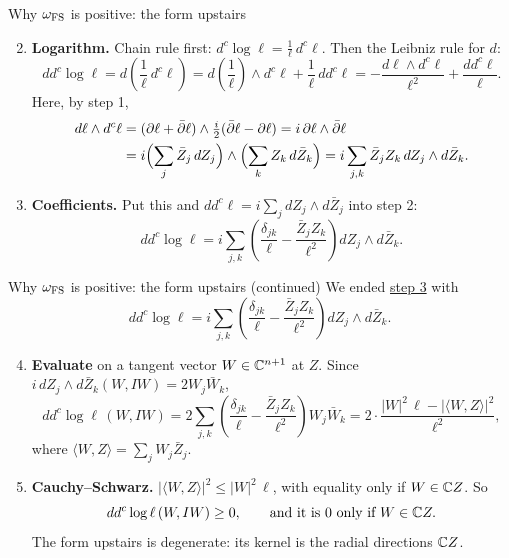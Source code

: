 \begin{frame}{Why \(\omega_{\rm FS}\) is positive: the form upstairs}
\label{fr:fs-upstairs}
\begin{enumerate}
\setcounter{enumi}{1}
\item \textbf{Logarithm.} Chain rule first: \(d^c\log\ell=\frac{1}{\ell}\,d^c\ell\). Then the Leibniz rule for \(d\):
\[
dd^c\log\ell
=d\left(\frac{1}{\ell}\,d^c\ell\right)
=d\left(\frac{1}{\ell}\right)\wedge d^c\ell+\frac{1}{\ell}\,dd^c\ell
=-\frac{d\ell\wedge d^c\ell}{\ell^2}+\frac{dd^c\ell}{\ell}.
\]
Here, by step 1,
\[
\begin{aligned}
d\ell\wedge d^c\ell&=(\partial\ell+\bar\partial\ell)\wedge\tfrac{i}{2}(\bar\partial\ell-\partial\ell)=i\,\partial\ell\wedge\bar\partial\ell\\
&=i\Bigl(\sum_j\bar Z_j\,dZ_j\Bigr)\wedge\Bigl(\sum_k Z_k\,d\bar Z_k\Bigr)
=i\sum_{j,k}\bar Z_jZ_k\,dZ_j\wedge d\bar Z_k.
\end{aligned}
\]
\item \textbf{Coefficients.} Put this and \(dd^c\ell=i\sum_j dZ_j\wedge d\bar Z_j\) into step 2:
\[
dd^c\log\ell=i\sum_{j,k}\left(\frac{\delta_{jk}}{\ell}-\frac{\bar Z_jZ_k}{\ell^2}\right)dZ_j\wedge d\bar Z_k.
\]
\end{enumerate}
\end{frame}

\begin{frame}{Why \(\omega_{\rm FS}\) is positive: the form upstairs (continued)}
We ended \hyperlink{fr:fs-upstairs}{step 3} with
\[
dd^c\log\ell=i\sum_{j,k}\left(\frac{\delta_{jk}}{\ell}-\frac{\bar Z_jZ_k}{\ell^2}\right)dZ_j\wedge d\bar Z_k.
\]
\begin{enumerate}
\setcounter{enumi}{3}
\item \textbf{Evaluate} on a tangent vector \(W\in\mathbb C^{n+1}\) at \(Z\). Since \(i\,dZ_j\wedge d\bar Z_k(W,IW)=2W_j\bar W_k\),
\[
dd^c\log\ell\,(W,IW)
=2\sum_{j,k}\left(\frac{\delta_{jk}}{\ell}-\frac{\bar Z_jZ_k}{\ell^2}\right)W_j\bar W_k
=2\cdot\frac{|W|^2\,\ell-|\langle W,Z\rangle|^2}{\ell^2},
\]
where \(\langle W,Z\rangle=\sum_j W_j\bar Z_j\).
\item \textbf{Cauchy--Schwarz.} \(|\langle W,Z\rangle|^2\le|W|^2\,\ell\), with equality only if \(W\in\mathbb C Z\). So
\[
dd^c\log\ell\,(W,IW)\ge0,\qquad\text{and it is }0\text{ only if }W\in\mathbb C Z.
\]
The form upstairs is degenerate: its kernel is the radial directions \(\mathbb C Z\).
\end{enumerate}
\end{frame}


